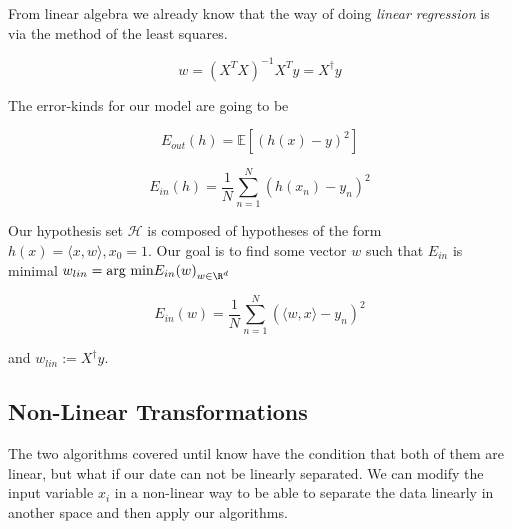 From linear algebra we already know that the way of doing \emph{linear regression} is via 
the method of the least squares.

\[
    w = (X^T X)^{-1}X^T y = X^{\dagger}y
\]

The error-kinds for our model are going to be 

\[
    E_{out}(h) = \mathbb{E}[(h(x) - y)^2]
\]

\[
    E_{in}(h) = \frac{1}{N} \sum_{n = 1}^{N}(h(x_n) - y_n)^2 
\]

Our hypothesis set \(\mathcal{H}\) is composed of hypotheses of the form \(h(x) = \langle x, w\rangle, x_0  = 1\).
Our goal is to find some vector \(w\) such that \(E_{in}\) is minimal \(w_{lin} = {\text{arg min} E_{in}(w)}_{w \in \R^d}\)

\[
    E_{in}(w) = \frac{1}{N} \sum_{n = 1}^{N}(\langle w, x \rangle - y_n)^2 
\]

and \(w_{lin} := X^{\dagger} y \).

\begin{center}
\end{center}

\subsection{Non-Linear Transformations}

The two algorithms covered until know have the condition that both of them are linear, but 
what if our date can not be linearly separated. We can modify the input variable \(x_i\) 
in a non-linear way to be able to separate the data linearly in another space and then apply our algorithms.


